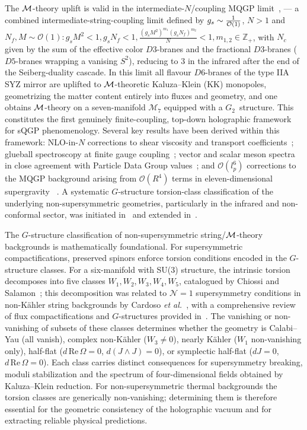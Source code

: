 \documentclass[a4paper,11pt,fleqn]{article}
\theoremstyle{plain}
\theoremstyle{definition}
\begin{document}
The ${\cal M}$-theory uplift is valid in the intermediate-$N$/coupling MQGP limit~\cite{MQGP}, \cite{ACMS} --- a combined
intermediate-string-coupling limit defined by $g_s\sim\frac{1}{{\cal O}(1)}$,
$N>1$ and $N_f, M\sim\mathcal{O}(1): g_s M^2<1, g_s N_f<1, \frac{\left(g_sM^2\right)^{m_1}\left(g_s N_f\right)^{m_2}}{N}<1, m_{1,2}\in\mathbb{Z}_+$, with $N_c$ given by the sum of the effective color $D3$-branes and the fractional $D3$-branes ($D5$-branes wrapping a vanising $S^2$), reducing to $3$ in the infrared after the end of the Seiberg-duality cascade. In this limit all flavour $D6$-branes of the type IIA SYZ mirror are uplifted to ${\cal M}$-theoretic Kaluza--Klein (KK) monopoles, geometrizing the matter content entirely into fluxes and geometry, and one obtains ${\cal M}$-theory on a seven-manifold $\mathcal{M}_7$ equipped with a
$G_2$~structure. This constitutes the first genuinely finite-coupling, top-down holographic
framework for sQGP phenomenology. Several key results have been derived within this
framework: NLO-in-$N$ corrections to shear viscosity and transport coefficients~\cite{Sil:2016jet};
glueball spectroscopy at finite gauge coupling~\cite{Sil:2019vbo};
vector and scalar meson spectra in close agreement with Particle Data Group
values~\cite{Misra:2017iig}; and $\mathcal{O}(l_p^6)$ corrections to the MQGP background
arising from $\mathcal{O}(R^4)$ terms in eleven-dimensional
supergravity ~\cite{OR4}. A systematic $G$-structure torsion-class classification of the
underlying non-supersymmetric geometries, particularly in the infrared and non-conformal sector,
was initiated in~\cite{NPB} and extended in~\cite{ACMS}.

The $G$-structure classification of non-supersymmetric string/${\cal M}$-theory backgrounds is
mathematically foundational. For supersymmetric compactifications, preserved spinors enforce
torsion conditions encoded in the $G$-structure classes. For a six-manifold with SU(3)
structure, the intrinsic torsion decomposes into five classes $W_1,W_2,W_3,W_4,W_5$,
catalogued by Chiossi and Salamon~\cite{Chiossi:2002}; this decomposition was related to
$\mathcal{N}=1$ supersymmetry conditions in non-K\"{a}hler string backgrounds by Cardoso
{\it et al.}~\cite{Cardoso:2002hd}, with a comprehensive review of flux compactifications
and $G$-structures provided in~\cite{Grana:2005jc}. The vanishing or non-vanishing of subsets
of these classes determines whether the geometry is Calabi--Yau (all vanish), complex
non-K\"{a}hler ($W_3\neq 0$), nearly K\"{a}hler ($W_1$ non-vanishing only), half-flat
($d\,\mathrm{Re}\,\Omega=0$, $d(J\wedge J)=0$), or symplectic half-flat ($dJ=0$,
$d\,\mathrm{Re}\,\Omega=0$). Each class carries distinct consequences for supersymmetry breaking, moduli stabilization and the spectrum of four-dimensional fields obtained by
Kaluza--Klein reduction. For non-supersymmetric thermal backgrounds the torsion classes are
generically non-vanishing; determining them is therefore essential for the
geometric consistency of the holographic vacuum and for extracting reliable physical predictions.
\end{document}
